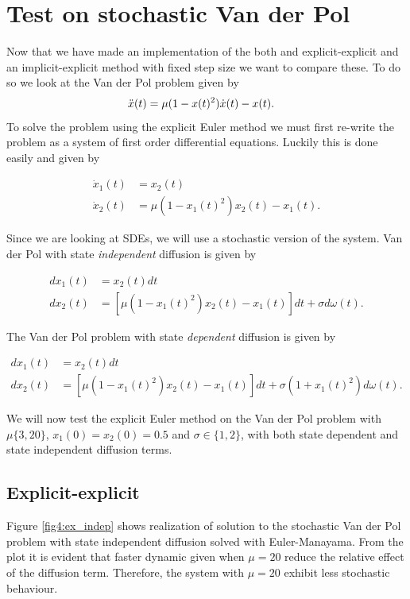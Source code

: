 \section{Test on stochastic Van der Pol}
Now that we have made an implementation of the both and explicit-explicit and an implicit-explicit method with fixed step size we want to compare these. To do so we look at the Van der Pol problem given by
\begin{align}
    \Ddot{x}(t) &= \mu (1-x(t)^2) \dot{x}(t) - x(t).
\end{align}
To solve the problem using the explicit Euler method we must first re-write the problem as a system of first order differential equations. Luckily this is done easily and given by

\begin{align}
    \dot{x}_1(t) &= x_2(t) \\
    \dot{x}_2(t) &= \mu(1-x_1(t)^2) x_2(t) - x_1(t).
\end{align}

Since we are looking at SDEs, we will use a stochastic version of the system. Van der Pol with state \textit{independent} diffusion is given by

\begin{align}
    dx_1(t) &= x_2(t)dt \\
    dx_2(t) &= \left[\mu(1-x_1(t)^2) x_2(t) - x_1(t)\right] dt + \sigma d\omega (t).
\end{align}

The Van der Pol problem with state \textit{dependent} diffusion is given by

\begin{align}
    dx_1(t) &= x_2(t)dt \\
    dx_2(t) &= \left[\mu(1-x_1(t)^2) x_2(t) - x_1(t)\right] dt + \sigma\left(1+ x_1(t)^2\right) d\omega (t).
\end{align}

We will now test the explicit Euler method on the Van der Pol problem with $\mu \{3,20\}$,  $x_1(0)=x_2(0)=0.5$ and $\sigma \in \{1,2\}$, with both state dependent and state independent diffusion terms.

\subsection{Explicit-explicit}
Figure \ref{fig4:ex_indep} shows realization of solution to the stochastic Van der Pol problem with state independent diffusion solved with Euler-Manayama. From the plot it is evident that faster dynamic given when $\mu=20$ reduce the relative effect of the diffusion term. Therefore, the system with $\mu=20$ exhibit less stochastic behaviour.

